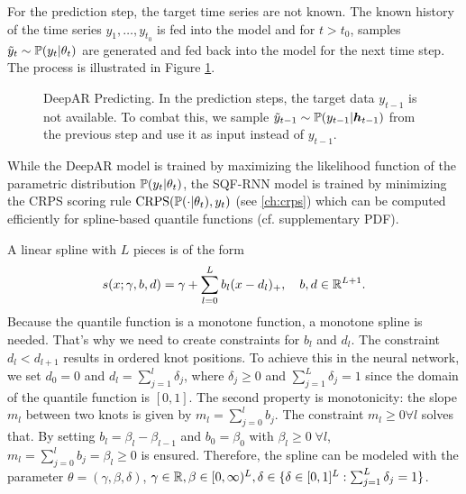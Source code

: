 For the prediction step, the target time series are not known. 
The known history of the time series \(y_1, \ldots, y_{t_0}\) is fed into the 
model and for \(t > t_0\), samples \(\tilde{y}_t \sim \P(y_t | \theta_t)\) 
are generated and fed back into the model for the next time step.
The process is illustrated in Figure \ref{fig:deepar-predicting}.

\begin{figure}[h]%
    \centering
    
    \caption[DeepAR Predicting]{DeepAR Predicting. 
    In the prediction steps, the target data \(y_{t-1}\) is not available. 
    To combat this, we sample \(\tilde{y}_{t-1} \sim \P(y_{t-1} | \boldsymbol{h}_{t-1})\) 
    from the previous step and use it as input instead of \(y_{t-1}\).}%
    \label{fig:deepar-predicting}%
\end{figure}

While the DeepAR model is trained by maximizing the likelihood function 
of the parametric distribution \(\P(y_t | \theta_t)\), 
the SQF-RNN model is trained by minimizing the CRPS scoring rule 
\(\mathrm{CRPS}(\P(\cdot | \theta_t), y_t)\) (see \ref{ch:crps}) 
which can be computed efficiently for spline-based quantile functions (cf. \Textcite{Gasthaus2019} supplementary PDF).

A linear spline with \(L\) pieces is of the form 
\[ s(x; \gamma, b, d) = \gamma + \sum_{l=0}^L b_l (x - d_l)_+, 
\quad b, d \in \R^{L+1}. \]
Because the quantile function is a monotone function, 
a monotone spline is needed. That's why we need to create constraints 
for \(b_l\) and \(d_l\).
The constraint \(d_l < d_{l+1}\) results in ordered knot positions. To achieve this 
in the neural network, we set \(d_0 = 0\) and \(d_l = \sum_{j=1}^l \delta_j\), 
where \(\delta_j \geq 0\) and \(\sum_{j=1}^L \delta_j = 1\) since the domain 
of the quantile function is \([0, 1]\). 
The second property is monotonicity: the slope \(m_l\) between two knots is given by 
\(m_l = \sum_{j=0}^l b_j\). The constraint \(m_l \geq 0 \forall l\) solves that.
By setting \(b_l = \beta_l - \beta_{l-1}\) and \(b_0 = \beta_0\) with \(\beta_l \geq 0\;\forall l\), 
\(m_l = \sum_{j=0}^l b_j = \beta_l \geq 0\) is ensured.
Therefore, the spline can be modeled with the parameter 
\(\theta = (\gamma, \beta, \delta)\), \(\gamma \in \R, \beta \in [0,\infty)^{L}, 
\delta \in \set{ \delta \in [0,1]^L: \sum_{j=1}^L \delta_j = 1 }\). 